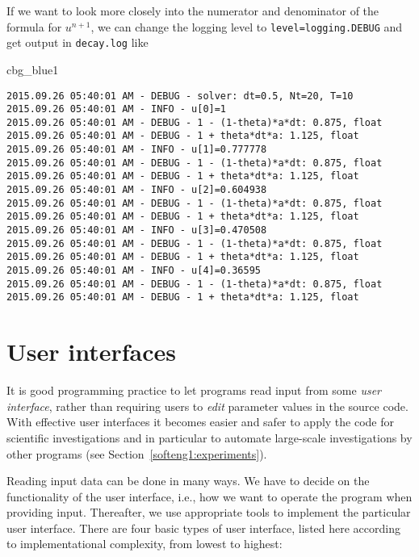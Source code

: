 \documentclass[graybox,sectrefs,envcountresetchap,open=right,final]{svmonodo}
\newenvironment{_cod_tight}[1]{
   \def\FrameCommand{\colorbox{#1}}
   \FrameRule0.6pt\MakeFramed {\FrameRestore}\vskip3mm}
   {\vskip0mm\endMakeFramed}
\newenvironment{cod}[1]{
\bgroup\rmfamily
\fboxsep=0mm\relax
\begin{_cod_tight}{#1}
\list{}{\parsep=-2mm\parskip=0mm\topsep=0pt\leftmargin=2mm
\rightmargin=2\leftmargin\leftmargin=4pt\relax}
\item\relax}
{\endlist\end{_cod_tight}\egroup}
\begin{document}
If we want to look more closely into the numerator and denominator of
the formula for $u^{n+1}$, we can change the logging level to
\texttt{level=logging.DEBUG} and get output in \texttt{decay.log} like

\begin{cod}{cbg_blue1}\begin{Verbatim}[numbers=none,fontsize=\fontsize{9pt}{9pt},baselinestretch=0.95,xleftmargin=2mm]
2015.09.26 05:40:01 AM - DEBUG - solver: dt=0.5, Nt=20, T=10
2015.09.26 05:40:01 AM - INFO - u[0]=1
2015.09.26 05:40:01 AM - DEBUG - 1 - (1-theta)*a*dt: 0.875, float
2015.09.26 05:40:01 AM - DEBUG - 1 + theta*dt*a: 1.125, float
2015.09.26 05:40:01 AM - INFO - u[1]=0.777778
2015.09.26 05:40:01 AM - DEBUG - 1 - (1-theta)*a*dt: 0.875, float
2015.09.26 05:40:01 AM - DEBUG - 1 + theta*dt*a: 1.125, float
2015.09.26 05:40:01 AM - INFO - u[2]=0.604938
2015.09.26 05:40:01 AM - DEBUG - 1 - (1-theta)*a*dt: 0.875, float
2015.09.26 05:40:01 AM - DEBUG - 1 + theta*dt*a: 1.125, float
2015.09.26 05:40:01 AM - INFO - u[3]=0.470508
2015.09.26 05:40:01 AM - DEBUG - 1 - (1-theta)*a*dt: 0.875, float
2015.09.26 05:40:01 AM - DEBUG - 1 + theta*dt*a: 1.125, float
2015.09.26 05:40:01 AM - INFO - u[4]=0.36595
2015.09.26 05:40:01 AM - DEBUG - 1 - (1-theta)*a*dt: 0.875, float
2015.09.26 05:40:01 AM - DEBUG - 1 + theta*dt*a: 1.125, float
\end{Verbatim}
\end{cod}
\noindent



\section{User interfaces}
\label{softeng1:basic:UI}

It is good programming practice to let programs read input from
some \emph{user interface}, rather than requiring users to \emph{edit}
parameter values in the source code. With effective user interfaces
it becomes easier and safer to apply the code for scientific investigations and
in particular to automate large-scale investigations by other programs
(see Section~\ref{softeng1:experiments}).

Reading input data can be done in many ways. We have to decide on the
functionality of the user interface, i.e., how we want to operate the
program when providing input. Thereafter, we use appropriate tools to
implement the particular user interface. There are four basic types
of user interface, listed here according to implementational
complexity, from lowest to highest:
\end{document}
